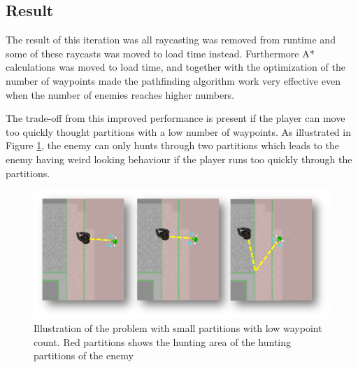 \subsection*{Result}
The result of this iteration was all raycasting was removed from runtime and some of these raycasts was moved to load time instead.
Furthermore A* calculations was moved to load time, and together with the optimization of the number of waypoints made the pathfinding algorithm work very effective even when the number of enemies reaches higher numbers.

The trade-off from this improved performance is present if the player can move too quickly thought partitions with a low number of waypoints.
As illustrated in Figure \ref{tradeoff}, the enemy can only hunts through two partitions which leads to the enemy having weird looking behaviour if the player runs too quickly through the partitions.
\begin{figure}[H]
        \includegraphics[width=\textwidth]{figures/astar/tradeoff.png}
    \caption{Illustration of the problem with small partitions with low waypoint count. Red partitions shows the hunting area of the hunting partitions of the enemy}\label{tradeoff}
\end{figure}